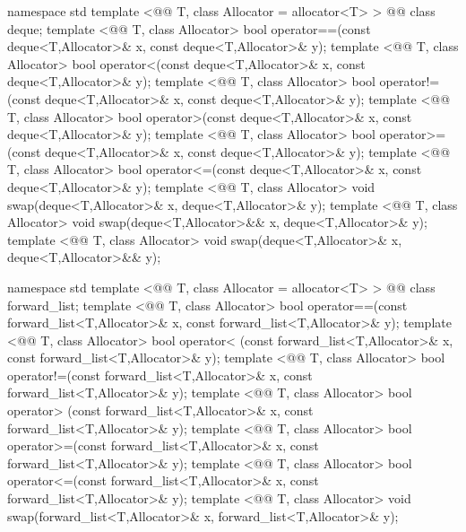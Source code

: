 \documentclass[american,twoside]{book}
\begin{document}
\begin{codeblock}
namespace std {
  template <@@ T, class Allocator = allocator<T> > 
    @@
    class deque;
  template <@@ T, class Allocator>
    bool operator==(const deque<T,Allocator>& x, const deque<T,Allocator>& y);
  template <@@ T, class Allocator>
    bool operator<(const deque<T,Allocator>& x, const deque<T,Allocator>& y);
  template <@@ T, class Allocator>
    bool operator!=(const deque<T,Allocator>& x, const deque<T,Allocator>& y);
  template <@@ T, class Allocator>
    bool operator>(const deque<T,Allocator>& x, const deque<T,Allocator>& y);
  template <@@ T, class Allocator>
    bool operator>=(const deque<T,Allocator>& x, const deque<T,Allocator>& y);
  template <@@ T, class Allocator>
    bool operator<=(const deque<T,Allocator>& x, const deque<T,Allocator>& y);
  template <@@ T, class Allocator>
    void swap(deque<T,Allocator>& x, deque<T,Allocator>& y);
  template <@@ T, class Allocator>
    void swap(deque<T,Allocator>&& x, deque<T,Allocator>& y);
  template <@@ T, class Allocator>
    void swap(deque<T,Allocator>& x, deque<T,Allocator>&& y);
}
\end{codeblock}

%

\begin{codeblock}
namespace std {
  template <@@ T, class Allocator = allocator<T> > 
    @@
    class forward_list; 
  template <@@ T, class Allocator> 
    bool operator==(const forward_list<T,Allocator>& x, const forward_list<T,Allocator>& y); 
  template <@@ T, class Allocator> 
    bool operator< (const forward_list<T,Allocator>& x, const forward_list<T,Allocator>& y); 
  template <@@ T, class Allocator> 
    bool operator!=(const forward_list<T,Allocator>& x, const forward_list<T,Allocator>& y); 
  template <@@ T, class Allocator> 
    bool operator> (const forward_list<T,Allocator>& x, const forward_list<T,Allocator>& y); 
  template <@@ T, class Allocator> 
    bool operator>=(const forward_list<T,Allocator>& x, const forward_list<T,Allocator>& y); 
  template <@@ T, class Allocator> 
    bool operator<=(const forward_list<T,Allocator>& x, const forward_list<T,Allocator>& y); 
  template <@@ T, class Allocator> 
    void swap(forward_list<T,Allocator>& x, forward_list<T,Allocator>& y); 
}
\end{codeblock}
\end{document}
